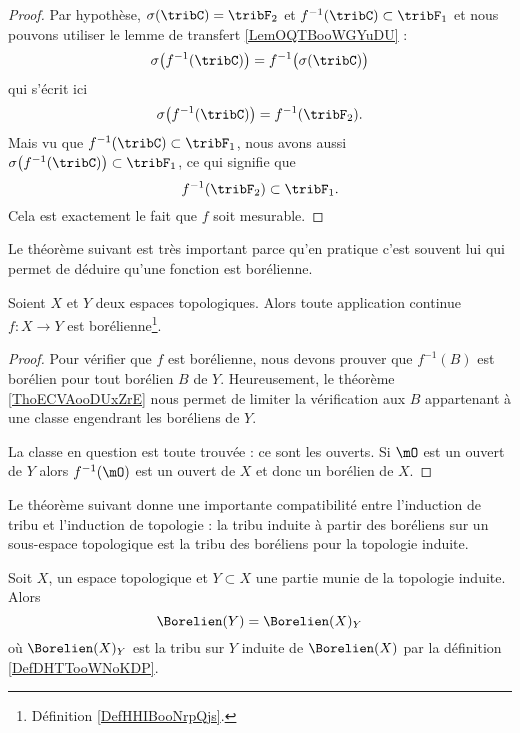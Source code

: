 \begin{proof}
    Par hypothèse, \( \sigma(\tribC)=\tribF_2\) et \( f^{-1}(\tribC)\subset \tribF_1\) et nous pouvons utiliser le lemme de transfert \ref{LemOQTBooWGYuDU} :
    \begin{equation}
        \sigma\big( f^{-1}(\tribC) \big)=f^{-1}\big( \sigma(\tribC) \big)
    \end{equation}
    qui s'écrit ici
    \begin{equation}
        \sigma\big( f^{-1}(\tribC) \big)=f^{-1}(\tribF_2).
    \end{equation}
    Mais vu que \( f^{-1}(\tribC)\subset \tribF_1\), nous avons aussi \( \sigma\big( f^{-1}(\tribC) \big)\subset \tribF_1\), ce qui signifie que
    \begin{equation}
        f^{-1}(\tribF_2)\subset \tribF_1.
    \end{equation}
    Cela est exactement le fait que \( f\) soit mesurable.
\end{proof}

Le théorème suivant est très important parce qu'en pratique c'est souvent lui qui permet de déduire qu'une fonction est borélienne.
\begin{theorem}     \label{ThoJDOKooKaaiJh}
    Soient \( X\) et \( Y\) deux espaces topologiques. Alors toute application continue \( f\colon X\to Y\) est borélienne\footnote{Définition \ref{DefHHIBooNrpQjs}.}.
\end{theorem}

\begin{proof}
    Pour vérifier que \( f\) est borélienne, nous devons prouver que \( f^{-1}(B)\) est borélien pour tout borélien \( B\) de \( Y\). Heureusement, le théorème \ref{ThoECVAooDUxZrE} nous permet de limiter la vérification aux \( B\) appartenant à une classe engendrant les boréliens de \( Y\).

    La classe en question est toute trouvée : ce sont les ouverts. Si \( \mO\) est un ouvert de \( Y\) alors \( f^{-1}(\mO)\) est un ouvert de \( X\) et donc un borélien de \( X\).
\end{proof}

Le théorème suivant donne une importante compatibilité entre l'induction de tribu et l'induction de topologie : la tribu induite à partir des boréliens sur un sous-espace topologique est la tribu des boréliens pour la topologie induite.
\begin{theorem}     \label{ThoSVTHooChgvYa}
    Soit \( X\), un espace topologique et \( Y\subset X\) une partie munie de la topologie induite. Alors
    \begin{equation}
        \Borelien(Y)=\Borelien(X)_Y
    \end{equation}
    où \( \Borelien(X)_Y\) est la tribu sur \( Y\) induite de \( \Borelien(X)\) par la définition \ref{DefDHTTooWNoKDP}.
\end{theorem}

